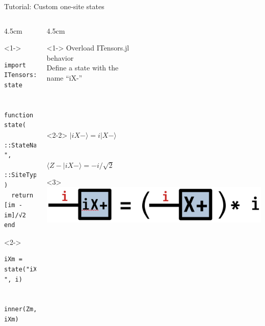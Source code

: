 \begin{frame}[fragile]{Tutorial: Custom one-site states}

\begin{columns}

\begin{column}{4.5cm}

\begin{onlyenv}<1->

\begin{lstlisting}[language=JuliaLocal, style=julia, basicstyle=\small]
import ITensors: state


function state(
  ::StateName"iX-",
  ::SiteType"S=1/2"
)
  return [im -im]/√2
end
\end{lstlisting}

\end{onlyenv}

\begin{onlyenv}<2->
\begin{lstlisting}[language=JuliaLocal, style=julia, basicstyle=\small]
iXm = state("iX-", i)


inner(Zm, iXm)
\end{lstlisting}
\end{onlyenv}

\end{column}

\begin{column}{4.5cm}

\begin{onlyenv}<1->
Overload ITensors.jl\\
behavior\\[\baselineskip]

Define a state with the\\
name ``iX-''\\
~\\
~\\
~\\
~\\
\end{onlyenv}

\begin{onlyenv}<2-2>
$|iX-\rangle = i|X-\rangle$ \\
~\\
~\\
$\langle Z-|iX-\rangle = -i/\sqrt{2}$
\end{onlyenv}

\begin{onlyenv}<3>
\includegraphics[width=1.0\textwidth]{
  slides/assets/iXp.png
}
\end{onlyenv}

\end{column}

\end{columns}

\end{frame}

